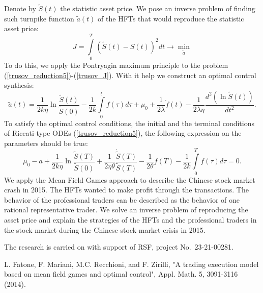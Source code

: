 \documentclass[12pt]{llncs}
\begin{document}
Denote by $\tilde{S}(t)$ the statistic asset price. We pose an inverse problem of finding such turnpike function $\tilde{a}(t)$ of the HFTs that would reproduce the statistic asset price:
\begin{equation}\label{trusov_J}
	J = \int\limits_0^T \left(\tilde{S}(t) - S(t)\right)^2 dt \rightarrow \min\limits_{\tilde{a}}
\end{equation}
To do this, we apply the Pontryagin maximum principle to the problem (\ref{trusov_reduction5})-(\ref{trusov_J}). With it help we construct an optimal control synthesis:
\[
	\tilde{a}(t) = \frac{1}{2k\eta}\ln\frac{\tilde{S}(t)}{\tilde{S}(0)} - \frac{1}{2k}\int\limits_0^t f(\tau)d\tau + \mu_0 + \frac{1}{2\lambda}\dot{f}(t) - \frac{1}{2\lambda\eta}\frac{d^2\left(\ln\tilde{S}(t)\right)}{dt^2}.
\]
To satisfy the optimal control conditions, the initial and the terminal conditions of Riccati-type ODEs (\ref{trusov_reduction5}), the following expression on the parameters should be true:
\[
	\mu_0 - a + \frac{1}{2k\eta}\ln\frac{\tilde{S}(T)}{\tilde{S}(0)} + \frac{1}{2\eta\theta}\frac{\dot{\tilde{S}}(T)}{\tilde{S}(T)} - \frac{1}{2\theta}f(T) - \frac{1}{2k}\int\limits_0^T f(\tau)d\tau = 0.
\]
We apply the Mean Field Games approach to describe the Chinese stock market crash in 2015. The HFTs wanted to make profit through the transactions. The behavior of the professional traders can be described as the behavior of one rational representative trader. We solve an inverse problem of reproducing the asset price and explain the strategies of the HFTs and the professional traders in the stock market during the Chinese stock market crisis in 2015. 

The research is carried on with support of RSF, project No.~23-21-00281.

\begin{thebibliography}{9} %
 L. Fatone, F. Mariani, M.C. Recchioni, and F. Zirilli, "A trading execution model based on mean field games
and optimal control", Appl. Math. 5, 3091-3116 (2014).



\end{thebibliography}
\end{document}
